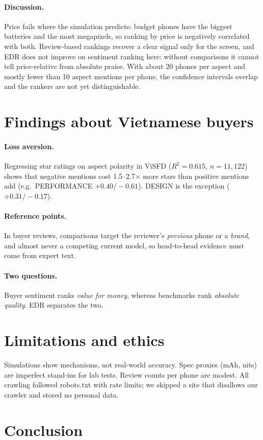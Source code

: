 \documentclass{article}
\begin{document}
\paragraph{Discussion.} Price fails where the simulation predicts: budget phones have the biggest batteries and the most megapixels,
so ranking by price is negatively correlated with both. Review-based rankings recover a clear signal only for the screen, and
EDR does not improve on sentiment ranking here: without comparisons it cannot tell price-relative from absolute praise. With about 20 phones per aspect and
mostly fewer than 10 aspect mentions per phone, the confidence intervals overlap and the rankers are not yet distinguishable.

\section{Findings about Vietnamese buyers}
\paragraph{Loss aversion.} Regressing star ratings on aspect polarity in ViSFD ($R^2=0.615$, $n=11{,}122$) shows that negative mentions cost
1.5--2.7$\times$ more stars than positive mentions add (e.g.\ PERFORMANCE $+0.40/-0.61$). DESIGN is the exception ($+0.31/-0.17$).
\paragraph{Reference points.} In buyer reviews, comparisons target the reviewer's \emph{previous} phone or a \emph{brand}, and almost never a competing current
model, so head-to-head evidence must come from expert text.
\paragraph{Two questions.} Buyer sentiment ranks \emph{value for money}, whereas benchmarks rank \emph{absolute quality}. EDR separates the two.

\section{Limitations and ethics}
Simulations show mechanisms, not real-world accuracy. Spec proxies (mAh, nits) are imperfect stand-ins for lab tests.
Review counts per phone are modest. All crawling followed robots.txt with rate limits; we skipped a site that disallows our crawler and stored no personal data.

\section{Conclusion}

{\small

}
\end{document}
